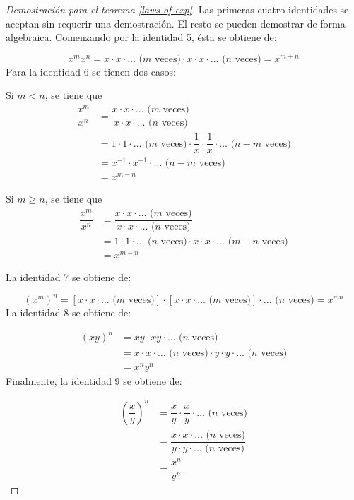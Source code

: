 \begin{proof}[Demostración para el teorema \ref{laws-of-exp}]
Las primeras cuatro identidades se aceptan sin requerir una demostración.
El resto se pueden demostrar de forma algebraica. Comenzando por la
identidad 5, ésta se obtiene de:

\[
x^{m}x^{n}=x\cdot x\cdot\dots\text{ (}m\text{ veces)}\cdot x\cdot x\cdot\dots\text{ (}n\text{ veces)}=x^{m+n}
\]
Para la identidad 6 se tienen dos casos:
\begin{casenv}
\item Si $m<n$, se tiene que
\begin{align*}
\dfrac{x^{m}}{x^{n}} & =\dfrac{x\cdot x\cdot\dots\text{ (}m\text{ veces)}}{x\cdot x\cdot\dots\text{ (}n\text{ veces)}}\\
 & =1\cdot1\cdot\dots\text{ (}m\text{ veces)}\cdot\dfrac{1}{x}\cdot\dfrac{1}{x}\cdot\dots\text{ (}n-m\text{ veces)}\\
 & =x^{-1}\cdot x^{-1}\cdot\dots\text{ (}n-m\text{ veces)}\\
 & =x^{m-n}
\end{align*}
\item Si $m\geq n$, se tiene que
\begin{align*}
\dfrac{x^{m}}{x^{n}} & =\dfrac{x\cdot x\cdot\dots\text{ (}m\text{ veces)}}{x\cdot x\cdot\dots\text{ (}n\text{ veces)}}\\
 & =1\cdot1\cdot\dots\text{ (}n\text{ veces)}\cdot x\cdot x\cdot\dots\text{ (}m-n\text{ veces)}\\
 & =x^{m-n}
\end{align*}
\end{casenv}
La identidad 7 se obtiene de:

\[
\left(x^{m}\right)^{n}=\left[x\cdot x\cdot\dots\text{ (}m\text{ veces)}\right]\cdot\left[x\cdot x\cdot\dots\text{ (}m\text{ veces)}\right]\cdot\dots\text{ (}n\text{ veces)}=x^{mn}
\]
La identidad 8 se obtiene de:

\begin{align*}
\left(xy\right)^{n} & =xy\cdot xy\cdot\dots\text{ (}n\text{ veces)}\\
 & =x\cdot x\cdot\dots\text{ (}n\text{ veces)}\cdot y\cdot y\cdot\dots\text{ (}n\text{ veces)}\\
 & =x^{n}y^{n}
\end{align*}
Finalmente, la identidad 9 se obtiene de:

\begin{align*}
\left(\dfrac{x}{y}\right)^{n} & =\dfrac{x}{y}\cdot\dfrac{x}{y}\cdot\dots\text{ (}n\text{ veces)}\\
 & =\dfrac{x\cdot x\cdot\dots\text{ (}n\text{ veces)}}{y\cdot y\cdot\dots\text{ (}n\text{ veces)}}\\
 & =\dfrac{x^{n}}{y^{n}}
\end{align*}
\end{proof}

